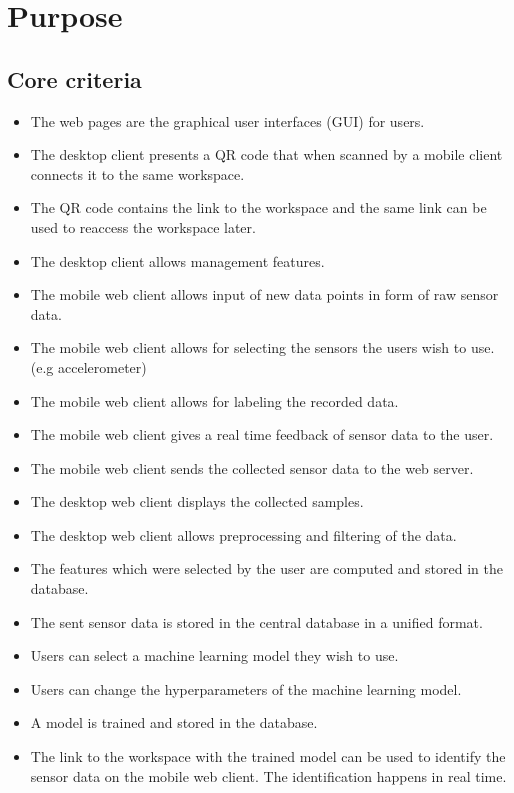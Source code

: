 \section{Purpose}




\subsection{Core criteria}
\begin{itemize}
    \item The web pages are the graphical user interfaces (GUI) for users.
    \item The desktop client presents a QR code that when scanned by a mobile client connects it to the same \gls{workspace}.
    \item The QR code contains the link to the \gls{workspace} and the same link can be used to reaccess the workspace later.
    \item The desktop client allows management features.
    \item The mobile web client allows input of new data points in form of raw sensor data.
    \item The mobile web client allows for selecting the sensors the users wish to use. (e.g accelerometer)
    \item The mobile web client allows for labeling the recorded data.
    \item The mobile web client gives a real time feedback of sensor data to the user.
    \item The mobile web client sends the collected sensor data to the web server.
    \item The desktop web client displays the collected samples.
    \item The desktop web client allows preprocessing and filtering of the data.
    \item The features which were selected by the user are computed and stored in the database.
    \item The sent sensor data is stored in the central database in a unified format.
    \item Users can select a machine learning model they wish to use.
    \item Users can change the hyperparameters of the machine learning model.
    \item A model is trained and stored in the database.
    \item The link to the workspace with the trained model can be used to identify the sensor data on the mobile web client. The identification happens in real time.
\end{itemize}

